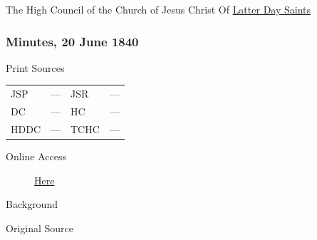 				The High Council of the Church of Jesus Christ Of \uline{Latter Day Saints}
				
		\subsubsection{Minutes, 20 June 1840}
			\label{EMS-1840-JS-20-JUN-1840}
			
			\begin{description}
				\item[Print Sources]
			\end{description}

			\begin{tabular}{p{0.5in}p{1in}p{0.5in}p{1in}}
				JSP	 	& ---		& JSR 		& --- \\
				DC	 	& ---		& HC 		& --- \\
				HDDC 	& ---		& TCHC 		& --- \\
			\end{tabular}
			
			\begin{description}
				\item[Online Access] \href{https://www.josephsmithpapers.org/paper-summary/minutes-20-june-1840/1}{Here}
			\end{description}
			
			\begin{description}
				\item[Background]
			\end{description}
			
			
			\begin{description}
				\item[Original Source]
			\end{description}
			
			

